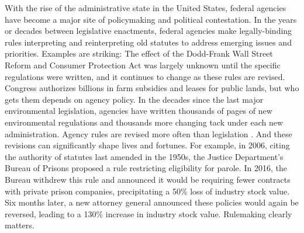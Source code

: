 With the rise of the administrative state in the United States, federal agencies have become a major site of policymaking and political contestation. In the years or decades between legislative enactments, federal agencies make legally-binding rules interpreting and reinterpreting old statutes to address emerging issues and priorities. %
Examples are striking: The effect of the Dodd-Frank Wall Street Reform and Consumer Protection Act was largely unknown until the specific regulations were written, and it continues to change as these rules are revised. 
Congress authorizes billions in farm subsidies and leases for public lands, but who gets them depends on agency policy. In the decades since the last major environmental legislation, agencies have written thousands of pages of new environmental regulations and thousands more changing tack under each new administration. Agency rules are revised more often than legislation \citep{Wagner2017}. And these revisions can significantly shape lives and fortunes. For example, in 2006, citing the authority of statutes last amended in the 1950s, the Justice Department's Bureau of Prisons proposed a rule restricting eligibility for parole. In 2016, the Bureau withdrew this rule and announced it would be requiring fewer contracts with private prison companies, precipitating a 50\% loss of industry stock value. Six months later, a new attorney general announced these policies would again be reversed, leading to a 130\% increase in industry stock value. %
Rulemaking clearly matters.

